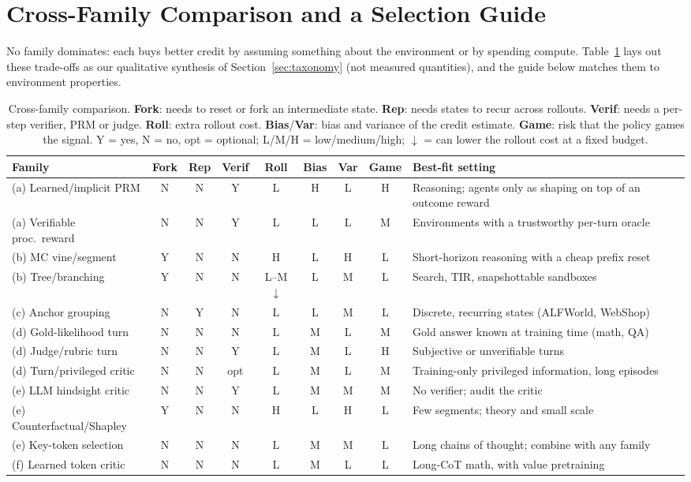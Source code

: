 \section{Cross-Family Comparison and a Selection Guide}\label{sec:comparison}

No family dominates: each buys better credit by assuming something about the environment or by spending compute. Table~\ref{tab:comparison} lays out these trade-offs as our qualitative synthesis of Section~\ref{sec:taxonomy} (not measured quantities), and the guide below matches them to environment properties.

\begin{table}[t]
\centering\small
\setlength{\tabcolsep}{2.5pt}
\caption{Cross-family comparison. \textbf{Fork}: needs to reset or fork an intermediate state. \textbf{Rep}: needs states to recur across rollouts. \textbf{Verif}: needs a per-step verifier, PRM or judge. \textbf{Roll}: extra rollout cost. \textbf{Bias}/\textbf{Var}: bias and variance of the credit estimate. \textbf{Game}: risk that the policy games the signal. Y = yes, N = no, opt = optional; L/M/H = low/medium/high; ${\downarrow}$ = can lower the rollout cost at a fixed budget.}
\label{tab:comparison}
\begin{tabularx}{\textwidth}{@{}l c c c c c c c >{\raggedright\arraybackslash}X@{}}
\toprule
Family & Fork & Rep & Verif & Roll & Bias & Var & Game & Best-fit setting \\
\midrule
(a) Learned/implicit PRM & N & N & Y & L & H & L & H & Reasoning; agents only as shaping on top of an outcome reward \\
(a) Verifiable proc.\ reward & N & N & Y & L & L & L & M & Environments with a trustworthy per-turn oracle \\
(b) MC vine/segment & Y & N & N & H & L & H & L & Short-horizon reasoning with a cheap prefix reset \\
(b) Tree/branching & Y & N & N & L--M${\downarrow}$ & L & M & L & Search, TIR, snapshottable sandboxes \\
(c) Anchor grouping & N & Y & N & L & L & M & L & Discrete, recurring states (ALFWorld, WebShop) \\
(d) Gold-likelihood turn & N & N & N & L & M & L & M & Gold answer known at training time (math, QA) \\
(d) Judge/rubric turn & N & N & Y & L & M & L & H & Subjective or unverifiable turns \\
(d) Turn/privileged critic & N & N & opt & L & M & L & M & Training-only privileged information, long episodes \\
(e) LLM hindsight critic & N & N & Y & L & M & M & M & No verifier; audit the critic \\
(e) Counterfactual/Shapley & Y & N & N & H & L & H & L & Few segments; theory and small scale \\
(e) Key-token selection & N & N & N & L & M & M & L & Long chains of thought; combine with any family \\
(f) Learned token critic & N & N & N & L & M & L & L & Long-CoT math, with value pretraining \\
\bottomrule
\end{tabularx}
\end{table}

